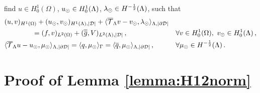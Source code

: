 find $u \in H^1_0(\Omega)$, $u_{\odot} \in H^1_0(\Lambda)$, $\lambda_{\odot} \in H^{-\frac 1 2}(\Lambda)$, such that
\begin{subequations}
\begin{align*}
&(u,v)_{H^1(\Omega)} + (u_{\odot},v_{\odot})_{H^1(\Lambda),|\mathcal{D}|} 
+  \langle {\overline{\mathcal{T}}_\Lambda} v - v_{\odot}, \lambda_{\odot} \rangle_{\Lambda, |\partial\mathcal{D}|} &&
\\
\nonumber
&\qquad\qquad= (f,v)_{L^2(\Omega)} +  (\overline{\overline{g}},V)_{L^2(\Lambda),|\mathcal{D}|}\,,
\quad && \forall v \in H^1_0(\Omega), \ v_{\odot} \in H^1_0(\Lambda)\,,
\\
& \langle {\overline{\mathcal{T}}_\Lambda} u - u_{\odot}, \mu_{\odot} \rangle_{\Lambda,|\partial\mathcal{D}|} 
= \langle q, \mu_{\odot} \rangle_\Gamma = \langle \overline{q}, \mu_{\odot} \rangle_{\Lambda,|\partial\mathcal{D}|} \,,
\quad &&\forall \mu_{\odot} \in H^{-\frac 1 2}(\Lambda)\,.
\end{align*}
\end{subequations}


\section{Proof of Lemma \ref{lemma:H12norm}}

